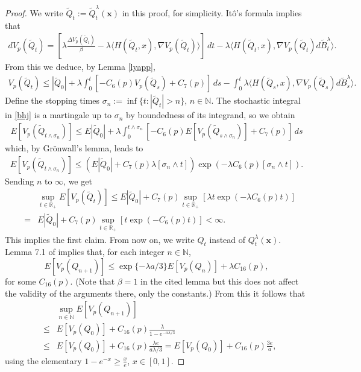 \documentclass[a4paper,draft]{article}
\begin{document}
\begin{proof} We write 
$\tilde{Q}_t:=\tilde{Q}^{\lambda}_t(\mathbf{x})$ in this proof, for simplicity.
It\^o's formula implies that
\begin{eqnarray*}
dV_p(\tilde{Q}_t)=\left[\lambda\frac{\Delta V_p(\tilde{Q}_t)}{\beta}-\lambda \langle H(\tilde{Q}_t,x),\nabla V_p(\tilde{Q}_t)\rangle\right]\, dt-\lambda \langle H(\tilde{Q}_t,x),\nabla V_p(\tilde{Q}_t)d\tilde{B}^{\lambda}_t\rangle.
\end{eqnarray*}
From this we deduce, by Lemma \ref{lyapp},
\begin{eqnarray}\label{bhj}
V_p(\tilde{Q}_t)\leq |\tilde{Q}_0|+\lambda \int_0^t [-C_6(p)V_p(\tilde{Q}_s)+C_7(p)]\, ds -\int_0^t \lambda \langle H(\tilde{Q}_s,x),\nabla V_p(\tilde{Q}_s)d\tilde{B}^{\lambda}_s\rangle.
\end{eqnarray}
Define the stopping times $\sigma_n:=\inf\{t:|\tilde{Q}_t|>n\}$, $n\in\mathbb{N}$. The stochastic integral
in \eqref{bhj} is a martingale up to $\sigma_n$ by boundedness of its integrand, so we obtain
\begin{eqnarray*}
E[V_p(\tilde{Q}_{t\wedge\sigma_n})]\leq E|\tilde{Q}_0|+\lambda\int_0^{t\wedge \sigma_n} [-C_6(p)
E[V_p(\tilde{Q}_{s\wedge\sigma_n})]+C_7(p)]\, ds
\end{eqnarray*}
which, by Gr\"onwall's lemma, leads to 
\begin{eqnarray*}
E[V_p(\tilde{Q}_{t\wedge \sigma_n})]\leq \left(E|\tilde{Q}_0|+C_7(p)\lambda[\sigma_n\wedge t]
\right)\exp\left(-\lambda C_6(p) [\sigma_n\wedge t]\right).
\end{eqnarray*}
Sending $n$ to $\infty$, we get
\begin{eqnarray*}
& & \sup_{t\in\mathbb{R}_+}E[V_p(\tilde{Q}_{t})]\leq E|\tilde{Q}_0|+C_7(p)\sup_{t\in\mathbb{R}_+}\left[\lambda t\exp(-\lambda C_6(p)t)\right]\\ &=& 
E|\tilde{Q}_0|+C_7(p)\sup_{t\in\mathbb{R}_+}\left[t\exp(-C_6(p)t)\right]<\infty.
\end{eqnarray*}
This implies the first claim.
From now on, we write $Q_t$ instead of $Q_t^{\lambda}(\mathbf{x})$.
Lemma 7.1 of \cite{convex} implies that, for each integer $n\in\mathbb{N}$,
$$
E[V_p(Q_{n+1})]\leq \exp\{-\lambda a/3\}E[V_p(Q_n)]+\lambda C_{16}(p),
$$ for some $C_{16}(p)$. (Note that $\beta=1$ in the cited lemma but
this does not affect the validity of the arguments there, only the constants.)
From this it follows that 
\begin{eqnarray*}
& & 
\sup_{n\in\mathbb{N}}E[V_p(Q_{n+1})]\\
&\leq& E[V_p(Q_0)]+ C_{16}(p)\frac{\lambda}{1-e^{-a\lambda/3}}\\
&\leq& E[V_p(Q_0)]+ C_{16}(p)\frac{\lambda e}{a\lambda/3} =E[V_p(Q_0)]+ C_{16}(p)\frac{3e}{a},
\end{eqnarray*}
using the elementary $1-e^{-x}\geq\frac{x}{e}$, $x\in [0,1]$.


\end{proof}
\end{document}
